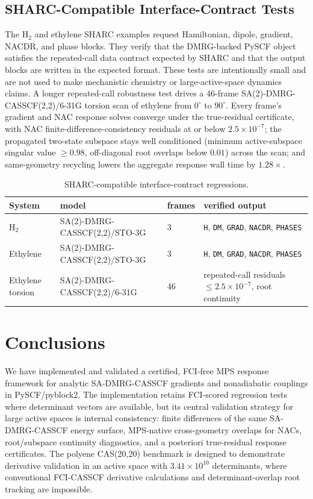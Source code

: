 \documentclass[journal=jctcce,manuscript=article]{achemso}
\begin{document}
\subsection{SHARC-Compatible Interface-Contract Tests}
The H$_2$ and ethylene SHARC examples request Hamiltonian, dipole, gradient, NACDR, and phase blocks.
They verify that the DMRG-backed PySCF object satisfies the repeated-call data contract expected by SHARC and that the output blocks are written in the expected format.
These tests are intentionally small and are not used to make mechanistic chemistry or large-active-space dynamics claims.
A longer repeated-call robustness test drives a 46-frame SA(2)-DMRG-CASSCF(2,2)/6-31G torsion scan of ethylene from $0^\circ$ to $90^\circ$.  Every frame's gradient and NAC response solves converge under the true-residual certificate, with NAC finite-difference-consistency residuals at or below $2.5\times10^{-7}$; the propagated two-state subspace stays well conditioned (minimum active-subspace singular value $\ge0.98$, off-diagonal root overlaps below $0.01$) across the scan; and same-geometry recycling lowers the aggregate response wall time by $1.28\times$.

\begin{table}[t]
\centering
\scriptsize
\caption{SHARC-compatible interface-contract regressions.}
\label{tab:sharc-contract}
\begin{tabular}{P{0.18\textwidth}P{0.27\textwidth}P{0.12\textwidth}P{0.33\textwidth}}
\toprule
System & model & frames & verified output \\
\midrule
H$_2$ & SA(2)-DMRG-CASSCF(2,2)/STO-3G & 3 & \texttt{H}, \texttt{DM}, \texttt{GRAD}, \texttt{NACDR}, \texttt{PHASES} \\
Ethylene & SA(2)-DMRG-CASSCF(2,2)/STO-3G & 3 & \texttt{H}, \texttt{DM}, \texttt{GRAD}, \texttt{NACDR}, \texttt{PHASES} \\
Ethylene torsion & SA(2)-DMRG-CASSCF(2,2)/6-31G & 46 & repeated-call residuals $\le2.5\times10^{-7}$, root continuity \\
\bottomrule
\end{tabular}
\end{table}

\section{Conclusions}
We have implemented and validated a certified, FCI-free MPS response framework for analytic SA-DMRG-CASSCF gradients and nonadiabatic couplings in PySCF/pyblock2.
The implementation retains FCI-scored regression tests where determinant vectors are available, but its central validation strategy for large active spaces is internal consistency: finite differences of the same SA-DMRG-CASSCF energy surface, MPS-native cross-geometry overlaps for NACs, root/subspace continuity diagnostics, and a posteriori true-residual response certificates.
The polyene CAS(20,20) benchmark is designed to demonstrate derivative validation in an active space with $3.41\times10^{10}$ determinants, where conventional FCI-CASSCF derivative calculations and determinant-overlap root tracking are impossible.
\end{document}
